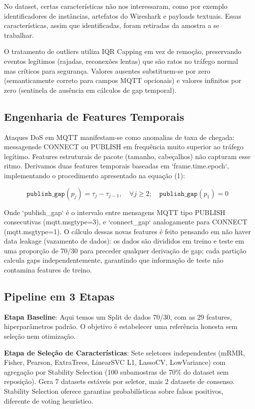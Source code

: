 \documentclass[12pt]{article}
\begin{document}
No dataset, certas características não nos interessaram, como por exemplo identificadores de 
instâncias, artefatos do Wireshark e payloads textuais. Essas características, assim que identificadas, 
foram retiradas da amostra a se trabalhar.

O tratamento de outliers utiliza IQR Capping em vez de remoção, preservando eventos legítimos (rajadas, reconexões lentas) que são ratos no tráfego normal mas críticos para segurança. Valores ausentes substituem-se por zero (semanticamente correto para campos MQTT opcionais) e valores infinitos por zero (sentinela de ausência em cálculos de gap temporal).

\subsection{Engenharia de Features Temporais}

Ataques DoS em MQTT manifestam-se como anomalias de taxa de chegada: messagensde CONNECT ou PUBLISH em frequência muito superior ao tráfego legítimo. Features estruturais de pacote (tamanho, cabeçalhos) não capturam esse ritmo. Derivamos duas features temporais baseadas em `frame.time.epoch`, implementando o procedimento apresentado na equação (1):

\begin{equation}
\mathtt{publish\_gap}(p_j) = \tau_j - \tau_{j-1}, \quad \forall j \geq 2; \quad \mathtt{publish\_gap}(p_1) = 0
\label{eq:publish_gap}
\end{equation}

Onde `publish\_gap` é o intervalo entre mensagens MQTT tipo PUBLISH consecutivas (mqtt.msgtype=3), e `connect\_gap` analogamente para CONNECT (mqtt.msgtype=1). O cálculo dessas novas features
é feito pensando em não haver data leakage (vazamento de dados): os dados são divididos 
em treino e teste em uma proporção de 70/30 para preceder qualquer derivação de gap; cada partição calcula gaps independentemente, garantindo que informação de teste não contamina features de treino.

\subsection{Pipeline em 3 Etapas}

\textbf{Etapa Baseline}: Aqui temos um Split de dados 70/30, com as 29 features, hiperparâmetros padrão. O 
objetivo é estabelecer uma referência honesta sem seleção nem otimização.

\textbf{Etapa de  Seleção de Características}: Sete seletores independentes (mRMR, Fisher, Pearson, ExtraTrees, LinearSVC L1, LassoCV, LowVariance) com agregação por Stability Selection (100 subamostras de 70\% do dataset sem reposição). Gera 7 datasets estáveis por seletor, mais 2 datasets de consenso. Stability Selection oferece garantias probabilísticas sobre falsos positivos, diferente de voting heurístico.
\end{document}
